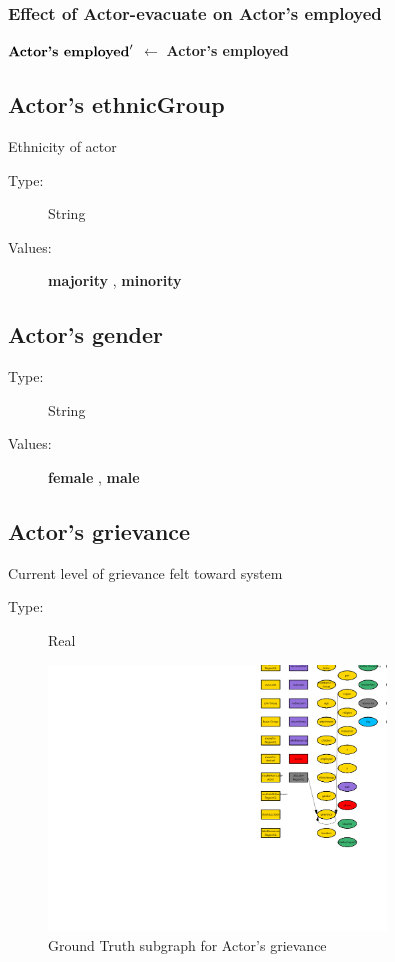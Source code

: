 \documentclass{article}%
\begin{document}
%
\subsubsection{Effect of Actor{-}evacuate on Actor's employed}%
\label{ssubsec:Effect of Actor{-}evacuate on Actor's employed}%
\begin{flushleft}%
$\mbox{\textbf{Actor's employed}} '$%
$\leftarrow$%
\textbf{Actor's employed}%
\end{flushleft}

%
\subsection{Actor's ethnicGroup}%
\label{subsec:Actor's ethnicGroup}%
Ethnicity of actor%
\begin{description}%
\item[Type:]%
String%
\item[Values:]%
\textbf{majority}%
, %
\textbf{minority}%
\end{description}

%
\subsection{Actor's gender}%
\label{subsec:Actor's gender}%
\begin{description}%
\item[Type:]%
String%
\item[Values:]%
\textbf{female}%
, %
\textbf{male}%
\end{description}

%
\subsection{Actor's grievance}%
\label{subsec:Actor's grievance}%
Current level of grievance felt toward system%
\begin{description}%
\item[Type:]%
Real%
\end{description}%


\begin{figure}[ht]%
\centering%
\includegraphics[width=0.8\textwidth]{images/grievanceOfActor.png}%
\caption{Ground Truth subgraph for Actor's grievance}%
\end{figure}
\end{document}
